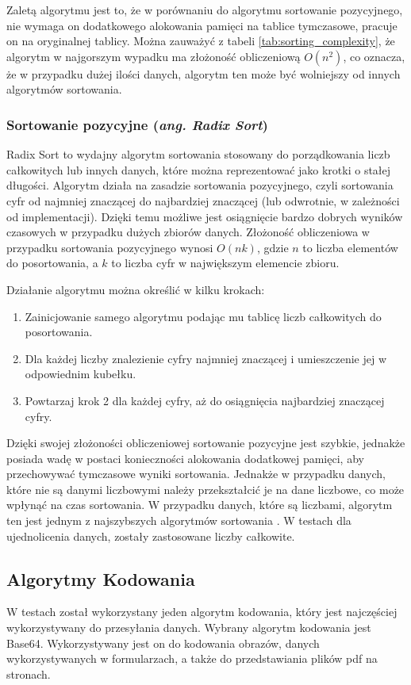Zaletą algorytmu jest to, że w porównaniu do algorytmu sortowanie pozycyjnego, nie wymaga on dodatkowego alokowania pamięci na tablice tymczasowe, pracuje on na oryginalnej tablicy. Można zauważyć z tabeli \ref{tab:sorting_complexity}, że algorytm w najgorszym wypadku ma złożoność obliczeniową $O(n^2)$, co oznacza, że w przypadku dużej ilości danych, algorytm ten może być wolniejszy od innych algorytmów sortowania.

\subsubsection{Sortowanie pozycyjne (\textit{ang. Radix Sort})}
Radix Sort to wydajny algorytm sortowania stosowany do porządkowania liczb całkowitych lub innych danych, które można reprezentować jako krotki o stałej długości. Algorytm działa na zasadzie sortowania pozycyjnego, czyli sortowania cyfr od najmniej znaczącej do najbardziej znaczącej (lub odwrotnie, w zależności od implementacji). Dzięki temu możliwe jest osiągnięcie bardzo dobrych wyników czasowych w przypadku dużych zbiorów danych. Złożoność obliczeniowa w przypadku sortowania pozycyjnego wynosi $O(nk)$, gdzie $n$ to liczba elementów do posortowania, a $k$ to liczba cyfr w największym elemencie zbioru.

Działanie algorytmu można określić w kilku krokach:
\begin{enumerate}
  \item Zainicjowanie samego algorytmu podając mu tablicę liczb całkowitych do posortowania.
  \item Dla każdej liczby znalezienie cyfry najmniej znaczącej i umieszczenie jej w odpowiednim kubełku.
  \item Powtarzaj krok 2 dla każdej cyfry, aż do osiągnięcia najbardziej znaczącej cyfry.
\end{enumerate}

Dzięki swojej złożoności obliczeniowej sortowanie pozycyjne jest szybkie, jednakże posiada wadę w postaci konieczności alokowania dodatkowej pamięci, aby przechowywać tymczasowe wyniki sortowania. Jednakże w przypadku danych, które nie są danymi liczbowymi należy przekształcić je na dane liczbowe, co może wpłynąć na czas sortowania. W przypadku danych, które są liczbami, algorytm ten jest jednym z najszybszych algorytmów sortowania \cite{sorting}. W testach dla ujednolicenia danych, zostały zastosowane liczby całkowite.

\subsection{Algorytmy Kodowania}
W testach został wykorzystany jeden algorytm kodowania, który jest najczęściej wykorzystywany do przesyłania danych. Wybrany algorytm kodowania jest Base64. Wykorzystywany jest on do kodowania obrazów, danych wykorzystywanych w formularzach, a także do przedstawiania plików pdf na stronach.

